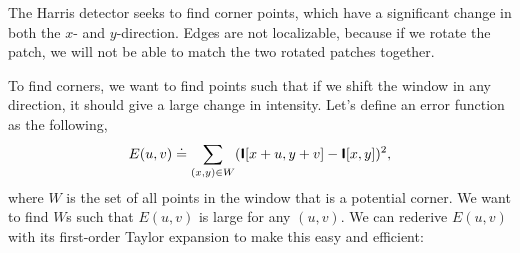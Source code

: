 \begin{marginfigure}
    \centering
    \caption{The Harris detector seeks to find corner points, which have a
        significant change in both the $x$- and $y$-direction. Edges are not
        localizable, because if we rotate the patch, we will not be able to match
        the two rotated patches together.}
    \label{fig:patch-uniqueness}
\end{marginfigure}

To find corners, we want to find points such that if we shift the window in any
direction, it should give a large change in intensity. Let's define an error
function as the following, \[
    E(u,v) \doteq \sum_{(x,y)\in W} (\bm{\mathsf{I}}[x+u,y+v]-\bm{\mathsf{I}}[x,y])^2,
\]
where $W$ is the set of all points in the window that is a potential corner.
We want to find $W$s such that $E(u,v)$ is large for any $(u,v)$. We can
rederive $E(u,v)$ with its first-order Taylor expansion to make this easy and
efficient:
